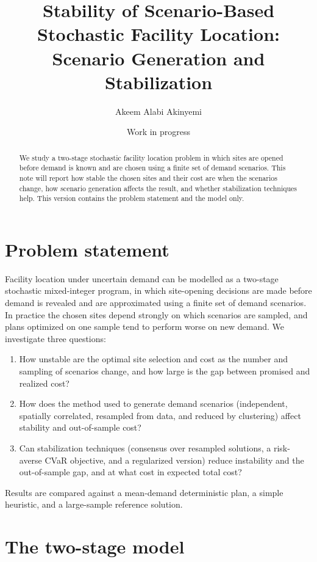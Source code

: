 \documentclass[11pt,a4paper]{article}
\title{Stability of Scenario-Based Stochastic Facility Location:\\
Scenario Generation and Stabilization}
\author{Akeem Alabi Akinyemi}
\date{Work in progress}
\begin{document}
\maketitle

\begin{abstract}
We study a two-stage stochastic facility location problem in which sites are opened
before demand is known and are chosen using a finite set of demand scenarios.
This note will report how stable the chosen sites and their cost are when the
scenarios change, how scenario generation affects the result, and whether
stabilization techniques help. This version contains the problem statement and
the model only.
\end{abstract}

\section{Problem statement}

Facility location under uncertain demand can be modelled as a two-stage stochastic
mixed-integer program, in which site-opening decisions are made before demand is
revealed and are approximated using a finite set of demand scenarios. In practice
the chosen sites depend strongly on which scenarios are sampled, and plans optimized
on one sample tend to perform worse on new demand. We investigate three questions:
\begin{enumerate}
  \item How unstable are the optimal site selection and cost as the number and
        sampling of scenarios change, and how large is the gap between promised and
        realized cost?
  \item How does the method used to generate demand scenarios (independent, spatially
        correlated, resampled from data, and reduced by clustering) affect stability
        and out-of-sample cost?
  \item Can stabilization techniques (consensus over resampled solutions, a
        risk-averse CVaR objective, and a regularized version) reduce instability and
        the out-of-sample gap, and at what cost in expected total cost?
\end{enumerate}
Results are compared against a mean-demand deterministic plan, a simple heuristic,
and a large-sample reference solution.

\section{The two-stage model}
\end{document}
